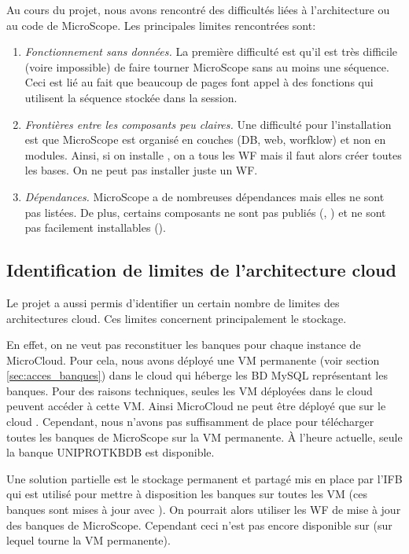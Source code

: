Au cours du projet, nous avons rencontré des difficultés liées à l'architecture ou au code de MicroScope.
Les principales limites rencontrées sont:
\begin{enumerate}
    \item \emph{Fonctionnement sans données.} La première difficulté est qu'il est très difficile (voire impossible) de faire tourner MicroScope sans au moins une séquence.
          Ceci est lié au fait que beaucoup de pages font appel à des fonctions qui utilisent la séquence stockée dans la session.
    \item \emph{Frontières entre les composants peu claires.} Une difficulté pour l'installation est que MicroScope est organisé en couches (DB, web, worfklow) et non en modules.
          Ainsi, si on installe , on a tous les WF mais il faut alors créer toutes les bases.
          On ne peut pas installer juste un WF.
    \item \emph{Dépendances.} MicroScope a de nombreuses dépendances mais elles ne sont pas listées.
          De plus, certains composants ne sont pas publiés (, )
          et ne sont pas facilement installables ().
\end{enumerate}

\subsection{Identification de limites de l'architecture cloud} \label{subsec:limites_coud}

Le projet a aussi permis d'identifier un certain nombre de limites des architectures cloud.
Ces limites concernent principalement le stockage.

En effet, on ne veut pas reconstituer les banques pour chaque instance de MicroCloud.
Pour cela, nous  avons déployé une VM permanente (voir section \ref{sec:acces_banques}) dans le cloud 
qui héberge les BD MySQL représentant les banques.
Pour des raisons techniques, seules les VM déployées dans le cloud 
peuvent accéder à cette VM.
Ainsi MicroCloud ne peut être déployé que sur le cloud .
Cependant, nous n'avons pas suffisamment de place pour télécharger toutes les banques de MicroScope sur la VM permanente.
À l'heure actuelle, seule la banque UNIPROTKBDB est disponible.

Une solution partielle est le stockage permanent et partagé mis en place par l'IFB
qui est utilisé pour mettre à disposition les banques sur toutes les VM (ces banques sont mises à jour avec ).
On pourrait alors utiliser les WF de mise à jour des banques de MicroScope.
Cependant ceci n'est pas encore disponible sur  (sur lequel tourne la VM permanente).

